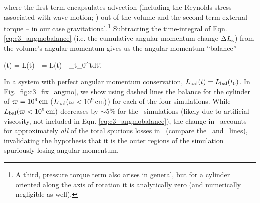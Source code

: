 

\noindent where the first term encapsulates advection (including the Reynolds stress associated with wave motion; \citealt{papal95, balb03, kratl16}) out of the volume and the second term external torque -- in our case gravitational.\footnote{A third, pressure torque term also arises in general, but for a cylinder oriented along the axis of rotation it is analytically zero (and numerically negligible as well).}  Subtracting the time-integral of Eqn. \ref{eq:c3_angmobalance} (i.e. the cumulative angular momentum change $\Delta \Lz$) from the volume's angular momentum gives us the angular momentum ``balance''

\eqbegin
\Lbal(t) = L(t) - \Delta \Lz = L(t) - \int_{t_0}^{t}dt'.
\label{eq:c3_angmobalance2}
\eqend

\noindent In a system with perfect angular momentum conservation, $\Lbal(t) = \Lbal(t_0)$.  In Fig. \ref{fig:c3_fix_angmo}, we show using dashed lines the balance for the cylinder of $\varpi = 10^9\,\mathrm{cm}$ ($\Lbal(\winnercyl)$) for each of the four simulations.  While $\Lbal(\winnercyl)$ decreases by $\sim5$\% for the \gasoline\ simulations (likely due to artificial viscosity, not included in Eqn. \ref{eq:c3_angmobalance}), the change in \Lbal\ accounts for approximately \textit{all} of the total spurious losses in \arepo\ (compare the \Lztot\ and \Lbal\ lines), invalidating the hypothesis that it is the outer regions of the simulation spuriously losing angular momentum.  


